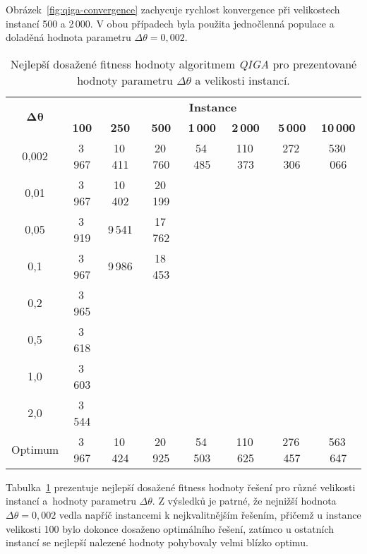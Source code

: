 Obrázek~\ref{fig:qiga-convergence} zachycuje rychlost konvergence při velikostech instancí 500 a 2\,000. 
V obou případech byla použita jednočlenná populace a doladěná hodnota parametru $\Delta\theta = 0{,}002$.

\begin{table}[ht!]
    \centering
    \begin{tabular}{c c c c c c c c}
        \toprule
        \multirow{2}{*}{\centering$\boldsymbol{\Delta\theta}$\rule{0pt}{3.0ex}} & \multicolumn{7}{c}{\textbf{Instance}} \\
        \cmidrule(lr){2-8}
              & \textbf{100}    & \textbf{250}     & \textbf{500}     & \textbf{1\,000}  & \textbf{2\,000}   & \textbf{5\,000}   & \textbf{10\,000}  \\
        \midrule
        0,002 & 3\,967 & 10\,411 & 20\,760 & 54\,485 & 110\,373 & 272\,306 & 530\,066 \\
        0,01  & 3\,967 & 10\,402 & 20\,199 &         &          &          &          \\
        0,05  & 3\,919 & 9\,541  & 17\,762 &         &          &          &          \\
        0,1   & 3\,967 & 9\,986  & 18\,453 &         &          &          &          \\
        0,2   & 3\,965 &         &         &         &          &          &          \\
        0,5   & 3\,618 &         &         &         &          &          &          \\
        1,0   & 3\,603 &         &         &         &          &          &          \\
        2,0   & 3\,544 &         &         &         &          &          &          \\
        \midrule
        Optimum & 3\,967 & 10\,424 & 20\,925 & 54\,503 & 110\,625 & 276\,457 & 563\,647 \\
        \bottomrule
    \end{tabular}
    \caption{Nejlepší dosažené fitness hodnoty algoritmem \emph{QIGA} pro prezentované hodnoty parametru \(\Delta\theta\) a velikosti instancí.}
    \label{tab:qiga-theta-best}
\end{table}

Tabulka~\ref{tab:qiga-theta-best} prezentuje nejlepší dosažené fitness hodnoty řešení pro různé velikosti instancí a~hodnoty parametru $\Delta\theta$. 
Z výsledků je patrné, že nejnižší hodnota $\Delta\theta = 0{,}002$ vedla napříč instancemi k nejkvalitnějším řešením, přičemž u instance velikosti 100 bylo dokonce dosaženo optimálního řešení, zatímco u ostatních instancí se nejlepší nalezené hodnoty pohybovaly velmi blízko optimu. 

